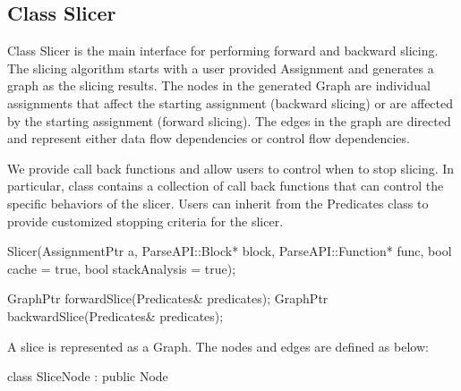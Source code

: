 \subsection{Class Slicer}
\label{sec:slicer}


Class Slicer is the main interface for performing forward and backward slicing.
The slicing algorithm starts with a user provided Assignment and generates a
graph as the slicing results. The nodes in the generated Graph are individual
assignments that affect the starting assignment (backward slicing) or are
affected by the starting assignment (forward slicing). The edges in the graph
are directed and represent either data flow dependencies or control flow
dependencies.

We provide call back functions
and allow users to control when to stop slicing.
In particular, class  contains a collection of call back functions that can
control the specific behaviors of the slicer. Users can inherit from the Predicates class
to provide customized stopping criteria for the slicer.

\begin{apient}
Slicer(AssignmentPtr a,
       ParseAPI::Block* block,
       ParseAPI::Function* func,
       bool cache = true,
       bool stackAnalysis = true);
\end{apient}

\begin{apient}
GraphPtr forwardSlice(Predicates& predicates);
GraphPtr backwardSlice(Predicates& predicates);
\end{apient}

A slice is represented as a Graph. The nodes and edges are defined as below:

\begin{apient}
class SliceNode : public Node
\end{apient}

